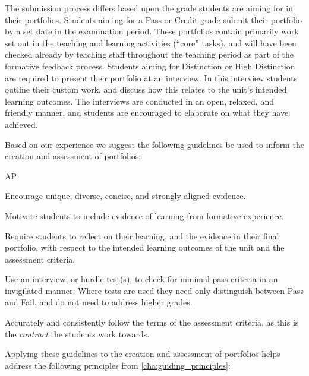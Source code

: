 The submission process differs based upon the grade students are aiming for in their portfolios. Students aiming for a Pass or Credit grade submit their portfolio by a set date in the examination period. These portfolios contain primarily work set out in the teaching and learning activities (``core'' tasks), and will have been checked already by teaching staff throughout the teaching period as part of the formative feedback process. Students aiming for Distinction or High Distinction are required to present their portfolio at an interview. In this interview students outline their custom work, and discuss how this relates to the unit's intended learning outcomes. The interviews are conducted in an open, relaxed, and friendly manner, and students are encouraged to elaborate on what they have achieved.

Based on our experience we suggest the following guidelines be used to inform the creation and assessment of portfolios:

%
% 

\begin{guidelines}{AP}
  \item \label{itm:ap_uniq} Encourage unique, diverse, concise, and strongly aligned evidence.
  \item \label{itm:ap_evidence} Motivate students to include evidence of learning from formative experience.
  \item \label{itm:ap_reflect} Require students to reflect on their learning, and the evidence in their final portfolio, with respect to the intended learning outcomes of the unit and the assessment criteria.
  \item \label{itm:ap_hurdle} Use an interview, or hurdle test(s), to check for minimal pass criteria in an invigilated manner. Where tests are used they need only distinguish between Pass and Fail, and do not need to address higher grades. 
  \item \label{itm:ap_assess} Accurately and consistently follow the terms of the assessment criteria, as this is the \emph{contract} the students work towards.
\end{guidelines}

Applying these guidelines to the creation and assessment of portfolios helps address the following principles from \cref{cha:guiding_principles}:

